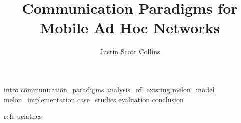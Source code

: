 \documentclass [PhD] {uclathes}
\title          {Communication Paradigms for Mobile Ad Hoc Networks}
\author         {Justin Scott Collins}
\begin{document}
\makeintropages


 {intro}
 {communication_paradigms}
 {analysis_of_existing}
 {melon_model}
 {melon_implementation}
 {case_studies}
 {evaluation}
 {conclusion}

 {refs}    %
 {uclathes} %
\end{document}
